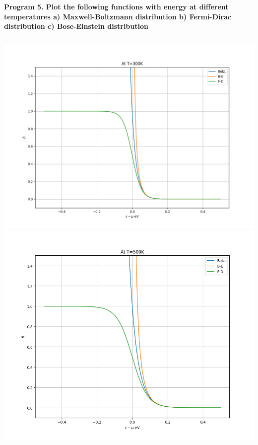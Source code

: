 \documentclass{article}
\begin{document}

	\textbf{Program 5. Plot the following functions with energy at different temperatures
		a) Maxwell-Boltzmann distribution
		b) Fermi-Dirac distribution
		c) Bose-Einstein distribution}\\
	\inputminted{python}{prac_6.py}
	\includegraphics[width=15 cm]{prac_6_300k.png}
	\includegraphics[width=15 cm]{prac_6_500k.png}
\end{document}
